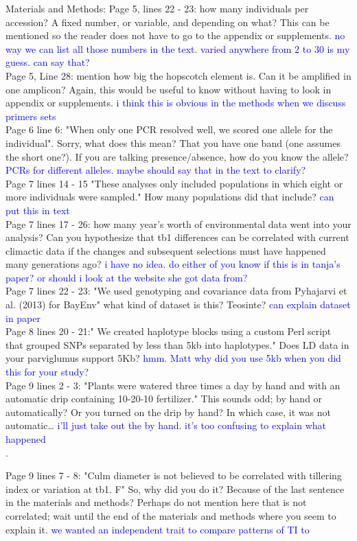 \documentclass[11pt]{article}
\newcommand{\res}[1]{\noindent \textcolor{blue}{{#1}} \\}
\begin{document}
Materials and Methods:
Page 5, lines 22 - 23: how many individuals per accession? A fixed number, or variable, and depending on what? This can be mentioned so the reader does not have to go to the appendix or supplements. \res{no way we can list all those numbers in the text. varied anywhere from 2 to 30 is my guess. can say that?}

Page 5, Line 28: mention how big the hopscotch element is.  Can it be amplified in one amplicon? Again, this would be useful to know without having to look in appendix or supplements. \res{i think this is obvious in the methods when we discuss primers sets}

Page 6 line 6: "When only one PCR resolved well, we scored one allele for the individual".  Sorry, what does this mean? That you have one band (one assumes the short one?). If you are talking presence/absence, how do you know the allele? \res{PCRs for different alleles. maybe should say that in the text to clarify?}

Page 7 lines 14 - 15 "These analyses only included populations in which eight or more individuals were sampled."  How many populations did that include? \res{can put this in text}

Page 7 lines 17 - 26: how many year's worth of environmental data went into your analysis? Can you hypothesize that tb1 differences can be correlated with current climactic data if the changes and subsequent selections must have happened many generations ago? \res{i have no idea. do either of you know if this is in tanja's paper? or should i look at the website she got data from?}

Page 7 lines 22 - 23: "We used genotyping and covariance data from Pyhajarvi et al. (2013) for BayEnv" what kind of dataset is this? Teosinte? \res{can explain dataset in paper}

Page 8 lines 20 - 21:" We created haplotype blocks using a custom Perl script that grouped SNPs separated by less than 5kb into haplotypes." Does LD data in your parviglumus support 5Kb? \res{hmm. Matt why did you use 5kb when you did this for your study?}

Page 9 lines 2 - 3: "Plants were watered three times a day by hand and with an automatic drip containing 10-20-10 fertilizer." This sounds odd; by hand or automatically? Or you turned on the drip by hand? In which case, it was not automatic… \res{i'll just take out the by hand. it's too confusing to explain what happened}. 

Page 9 lines 7 - 8: "Culm diameter is not believed to be correlated with tillering index or variation at tb1. F" So, why did you do it? Because of the last sentence in the materials and methods? Perhaps do not mention here that is not correlated; wait until the end of the materials and methods where you seem to explain it. \res{we wanted an independent trait to compare patterns of TI to}
\end{document}
